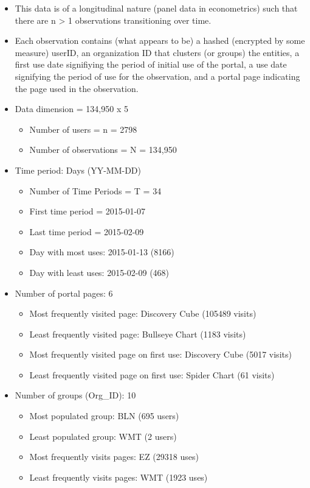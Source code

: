\documentclass[11pt]{article}
\providecommand{\tightlist}{%
      \setlength{\itemsep}{0pt}\setlength{\parskip}{0pt}}
\begin{document}
\begin{itemize}
\item
  This data is of a longitudinal nature (panel data in econometrics)
  such that there are n \textgreater{} 1 observations transitioning over
  time.
\item
  Each observation contains (what appears to be) a hashed (encrypted by
  some measure) userID, an organization ID that clusters (or groups) the
  entities, a first use date signifiying the period of initial use of
  the portal, a use date signifying the period of use for the
  observation, and a portal page indicating the page used in the
  observation.
\item
  Data dimension = 134,950 x 5

  \begin{itemize}
  \tightlist
  \item
    Number of users = n = 2798
  \item
    Number of observations = N = 134,950
  \end{itemize}
\item
  Time period: Days (YY-MM-DD)

  \begin{itemize}
  \tightlist
  \item
    Number of Time Periods = T = 34
  \item
    First time period = 2015-01-07
  \item
    Last time period = 2015-02-09
  \item
    Day with most uses: 2015-01-13 (8166)
  \item
    Day with least uses: 2015-02-09 (468)
  \end{itemize}
\item
  Number of portal pages: 6

  \begin{itemize}
  \tightlist
  \item
    Most frequently visited page: Discovery Cube (105489 visits)
  \item
    Least frequently visited page: Bullseye Chart (1183 visits)
  \item
    Most frequently visited page on first use: Discovery Cube (5017
    visits)
  \item
    Least frequently visited page on first use: Spider Chart (61 visits)
  \end{itemize}
\item
  Number of groups (Org\_ID): 10

  \begin{itemize}
  \tightlist
  \item
    Most populated group: BLN (695 users)
  \item
    Least populated group: WMT (2 users)
  \item
    Most frequently visits pages: EZ (29318 uses)
  \item
    Least frequently visits pages: WMT (1923 uses)
  \end{itemize}
\end{itemize}
\end{document}
